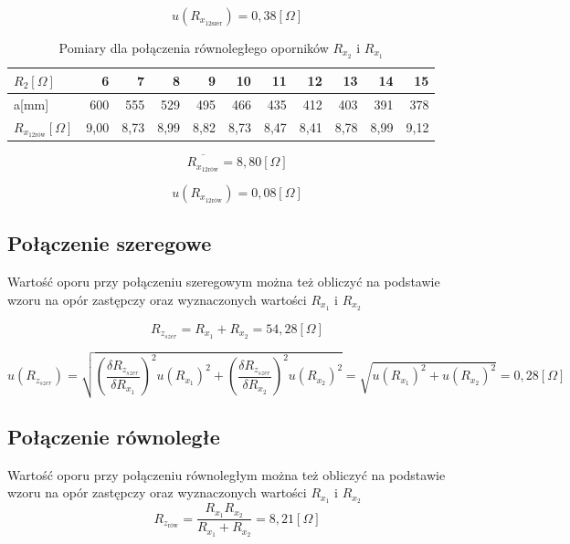 \documentclass [a4paper,11pt]{article}
\begin{document}
\begin{equation}
u(R_{x_{12\text{szer}}}) = 0,38 [\Omega]
\label{eq:R_x12szer_delta} 
\end{equation}

\begin{table}[H]
\centering
\begin{tabular}{|l|r|r|r|r|r|r|r|r|r|r|}
\hline
$R_2[\Omega]$    & 6    & 7    & 8    & 9    & 10   & 11   & 12   & 13   & 14   & 15   \\
\hline
a[mm]    & 600  & 555  & 529  & 495  & 466  & 435  & 412  & 403  & 391  & 378  \\
\hline
$R_{x_{12\text{rów}}}[\Omega]$& 9,00 & 8,73 & 8,99 & 8,82 & 8,73 & 8,47 & 8,41 & 8,78 & 8,99 & 9,12 \\
\hline
\end{tabular}
\caption{Pomiary dla połączenia równoległego oporników $R_{x_2}$ i $R_{x_1}$}
\label{tab:Rx12row}
\end{table}

\begin{equation}
\overline{R_{x_{12\text{rów}}}} = 8,80 [\Omega]
\label{eq:R_x12rów_śr} 
\end{equation}

\begin{equation}
u(R_{x_{12\text{rów}}}) = 0,08 [\Omega]
\label{eq:R_x12row_delta} 
\end{equation}

\subsection{Połączenie szeregowe}
Wartość oporu przy połączeniu szeregowym można też obliczyć na podstawie wzoru na opór zastępczy oraz wyznaczonych wartości $R_{x_1}$ i  $R_{x_2}$

\begin{equation}
R_{z_{szer}} = R_{x_1} + R_{x_2} = 54,28 [\Omega]
\label{eq:R_x12szer_zast} 
\end{equation}

\begin{equation}
u(R_{z_{szer}}) = \sqrt{\left( \frac{\delta R_{z_{szer}} }{\delta R_{x_1}}  \right)^2 u(R_{x_1})^2  +\left( \frac{\delta R_{z_{szer}} }{\delta R_{x_2}}  \right)^2  u(R_{x_2})^2  }  = \sqrt{u(R_{x_1})^2 + u(R_{x_2})^2} =  0,28 [\Omega]
\label{eq:R_x12szer_zast_delta} 
\end{equation}

\subsection{Połączenie równoległe}
Wartość oporu przy połączeniu równoległym można też obliczyć na podstawie wzoru na opór zastępczy oraz wyznaczonych wartości $R_{x_1}$ i  $R_{x_2}$
\begin{equation}
R_{z_\text{rów}} = \frac{ R_{x_1} R_{x_2}}{ R_{x_1} + R_{x_2}} = 8,21 [\Omega]
\label{eq:R_x12row_zast} 
\end{equation}
\end{document}

